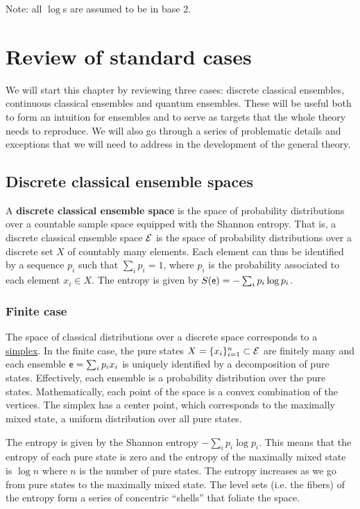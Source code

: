 Note: all $\log$s are assumed to be in base 2.

\section{Review of standard cases}

We will start this chapter by reviewing three cases: discrete classical ensembles, continuous classical ensembles and quantum ensembles. These will be useful both to form an intuition for ensembles and to serve as targets that the whole theory needs to reproduce. We will also go through a series of problematic details and exceptions that we will need to address in the development of the general theory.

\subsection{Discrete classical ensemble spaces}

\begin{defn}
	A \textbf{discrete classical ensemble space} is the space of probability distributions over a countable sample space equipped with the Shannon entropy. That is, a discrete classical ensemble space $\mathcal{E}$ is the space of probability distributions over a discrete set $X$ of countably many elements. Each element can thus be identified by a sequence $p_i$ such that $\sum_i p_i = 1$, where $p_i$ is the probability associated to each element $x_i \in X$. The entropy is given by $S(\mathsf{e}) = - \sum_i p_i \log p_i$.
\end{defn}

\subsubsection{Finite case}

The space of classical distributions over a discrete space corresponds to a \href{https://en.wikipedia.org/wiki/Simplex}{simplex}. In the finite case, the pure states $X = \{x_i\}_{i=1}^{n} \subset \mathcal{E}$ are finitely many and each ensemble $\mathsf{e} = \sum_i p_i x_i$ is uniquely identified by a decomposition of pure states. Effectively, each ensemble is a probability distribution over the pure states. Mathematically, each point of the space is a convex combination of the vertices. The simplex has a center point, which corresponds to the maximally mixed state, a uniform distribution over all pure states. 

The entropy is given by the Shannon entropy $-\sum_i p_i \log p_i$. This means that the entropy of each pure state is zero and the entropy of the maximally mixed state is $\log n$ where $n$ is the number of pure states. The entropy increases as we go from pure states to the maximally mixed state. The level sets (i.e. the fibers) of the entropy form a series of concentric ``shells'' that foliate the space.

